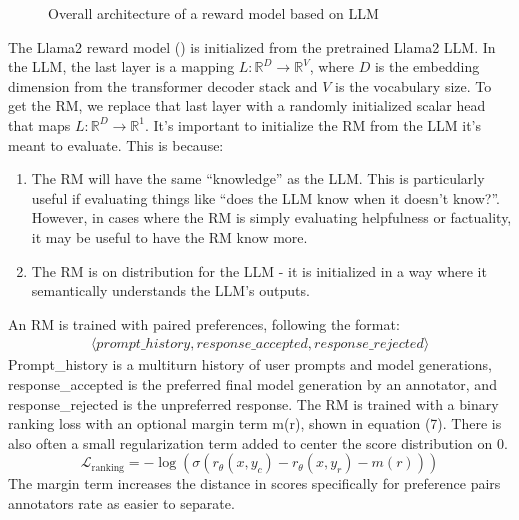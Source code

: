 \documentclass[
  letterpaper,
  numbers=noenddot,
  DIV=11]{scrreprt}
\theoremstyle{definition}
\theoremstyle{plain}
\theoremstyle{plain}
\theoremstyle{remark}
\begin{document}
\begin{figure}


\caption{\label{fig-rm-arch}Overall architecture of a reward model based
on LLM}

\end{figure}%

The Llama2 reward model ()
is initialized from the pretrained Llama2 LLM. In the LLM, the last
layer is a mapping \(L: \mathbb{R}^D \rightarrow \mathbb{R}^V\), where
\(D\) is the embedding dimension from the transformer decoder stack and
\(V\) is the vocabulary size. To get the RM, we replace that last layer
with a randomly initialized scalar head that maps
\(L: \mathbb{R}^D \rightarrow \mathbb{R}^1\). It's important to
initialize the RM from the LLM it's meant to evaluate. This is because:

\begin{enumerate}
\def\labelenumi{\arabic{enumi}.}
\item
  The RM will have the same ``knowledge'' as the LLM. This is
  particularly useful if evaluating things like ``does the LLM know when
  it doesn't know?''. However, in cases where the RM is simply
  evaluating helpfulness or factuality, it may be useful to have the RM
  know more.
\item
  The RM is on distribution for the LLM - it is initialized in a way
  where it semantically understands the LLM's outputs.
\end{enumerate}

An RM is trained with paired preferences, following the format:
\[\begin{aligned}
    \langle prompt\_history, response\_accepted, response\_rejected \rangle
\end{aligned}\] Prompt\_history is a multiturn history of user prompts
and model generations, response\_accepted is the preferred final model
generation by an annotator, and response\_rejected is the unpreferred
response. The RM is trained with a binary ranking loss with an optional
margin term m(r), shown in equation (7). There is also often a small
regularization term added to center the score distribution on 0.
\[\mathcal{L}_{\text{ranking}} = -\log(\sigma(r_\theta(x,y_c) - r_\theta(x,y_r) - m(r)))\]
The margin term increases the distance in scores specifically for
preference pairs annotators rate as easier to separate.
\end{document}
